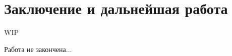 \section{Заключение и дальнейшая работа}
\label{sec:Conclusion} 

WIP

Работа не закончена...

\newpage
